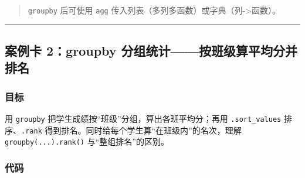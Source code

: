 \begin{quote}
\texttt{groupby} 后可使用 \texttt{agg}
传入列表（多列多函数）或字典（列-\textgreater 函数）。
\end{quote}

\begin{center}\rule{0.5\linewidth}{0.5pt}\end{center}

\subsection{案例卡 2：groupby
分组统计------按班级算平均分并排名}\label{ux6848ux4f8bux5361-2groupby-ux5206ux7ec4ux7edfux8ba1ux6309ux73edux7ea7ux7b97ux5e73ux5747ux5206ux5e76ux6392ux540d}

\subsubsection{目标}\label{ux76eeux6807-18}

用 \texttt{groupby} 把学生成绩按``班级''分组，算出各班平均分；再用
\texttt{.sort\_values} 排序、\texttt{.rank}
得到排名。同时给每个学生算``在班级内''的名次，理解
\texttt{groupby(...).rank()} 与``整组排名''的区别。

\subsubsection{代码}\label{ux4ee3ux7801-20}

